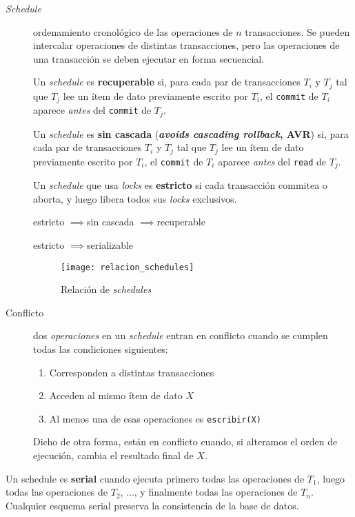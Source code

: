\documentclass[a4paper, twoside]{article}
\begin{document}
\begin{description}
\item [{\emph{Schedule}}] ordenamiento cronológico de las operaciones de
$n$ transacciones. Se pueden intercalar operaciones de distintas
transacciones, pero las operaciones de una transacción se deben ejecutar
en forma secuencial.


Un \emph{schedule} es \textbf{recuperable} si, para cada par de transacciones
$T_{i}$ y $T_{j}$ tal que $T_{j}$ lee un ítem de dato previamente
escrito por $T_{i}$, el \texttt{commit} de $T_{i}$ aparece \emph{antes}
del \texttt{commit} de $T_{j}$. 


Un \emph{schedule}\textbf{ }es\textbf{ sin cascada} (\textbf{\emph{avoids
cascading rollback}}\textbf{, AVR}) si, para cada par de transacciones
$T_{i}$ y $T_{j}$ tal que $T_{j}$ lee un ítem de dato previamente
escrito por $T_{i}$, el \texttt{commit} de $T_{i}$ aparece \emph{antes}
del \texttt{read} de $T_{j}$. 


Un \emph{schedule} que usa \emph{locks }es \textbf{estricto} si cada
transacción commitea o aborta, y luego libera todos sus \emph{locks}
exclusivos.


\noindent \begin{center}
estricto $\implies$sin cascada $\implies$recuperable
\par\end{center}


\noindent \begin{center}
estricto $\implies$serializable
\par\end{center}


\begin{figure}[H]
\noindent \begin{centering}
\texttt{[image: relacion\_schedules]}
\par\end{centering}

\protect\caption{Relación de \emph{schedules}}


\end{figure}


\item [{Conflicto}] dos \emph{operaciones} en un \emph{schedule} entran
en conflicto cuando se cumplen todas las condiciones siguientes:

\begin{enumerate}
\item Corresponden a distintas transacciones
\item Acceden al mismo ítem de dato $X$
\item Al menos una de esas operaciones es \texttt{escribir(X)}
\end{enumerate}

Dicho de otra forma, están en conflicto cuando, si alteramos el orden
de ejecución, cambia el resultado final de $X$.

\end{description}
Un schedule es \textbf{serial} cuando ejecuta primero todas las operaciones
de $T_{1}$, luego todas las operaciones de $T_{2}$, ..., y finalmente
todas las operaciones de $T_{n}$. Cualquier esquema serial preserva
la consistencia de la base de datos.
\end{document}
